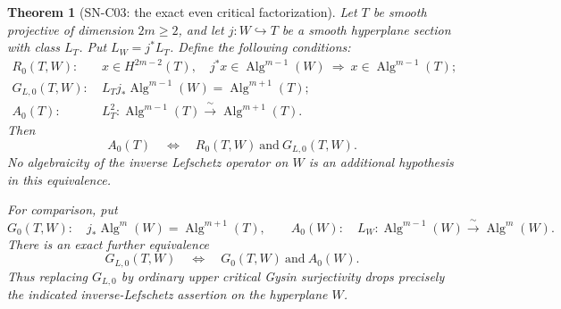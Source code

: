 \documentclass[11pt,a4paper]{article}
\newtheorem{theorem}{Theorem}[section]
\theoremstyle{definition}
\theoremstyle{remark}
\begin{document}
\begin{theorem}[SN-C03: the exact even critical factorization]
\label{thm:weighted-critical}
Let $T$ be smooth projective of dimension $2m\ge2$, and let
$j:W\hookrightarrow T$ be a smooth hyperplane section with class $L_T$.
Put $L_W=j^*L_T$.  Define the following conditions:
\begin{align*}
 R_0(T,W):\ &x\in H^{2m-2}(T),\quad
             j^*x\in\operatorname{Alg}^{m-1}(W)
             \ \Longrightarrow\ x\in\operatorname{Alg}^{m-1}(T);\\
 G_{L,0}(T,W):\ &L_Tj_*\operatorname{Alg}^{m-1}(W)
                    =\operatorname{Alg}^{m+1}(T);\\
 A_0(T):\ &L_T^2:\operatorname{Alg}^{m-1}(T)
                    \xrightarrow{\ \sim\ }
                    \operatorname{Alg}^{m+1}(T).
\end{align*}
Then
\begin{equation}
 A_0(T)\quad\Longleftrightarrow\quad
 R_0(T,W)\ \text{and}\ G_{L,0}(T,W).
 \label{eq:weighted-equivalence}
\end{equation}
No algebraicity of the inverse Lefschetz operator on $W$ is an
additional hypothesis in this equivalence.

For comparison, put
\[
 G_0(T,W):\quad
 j_*\operatorname{Alg}^{m}(W)=\operatorname{Alg}^{m+1}(T),
 \qquad
 A_0(W):\quad L_W:\operatorname{Alg}^{m-1}(W)
                       \xrightarrow{\ \sim\ }\operatorname{Alg}^{m}(W).
\]
There is an exact further equivalence
\begin{equation}
 G_{L,0}(T,W)\quad\Longleftrightarrow\quad
 G_0(T,W)\ \text{and}\ A_0(W).
 \label{eq:gysin-hidden-inverse}
\end{equation}
Thus replacing $G_{L,0}$ by ordinary upper critical Gysin
surjectivity drops precisely the indicated inverse-Lefschetz
assertion on the hyperplane $W$.
\end{theorem}
\end{document}
